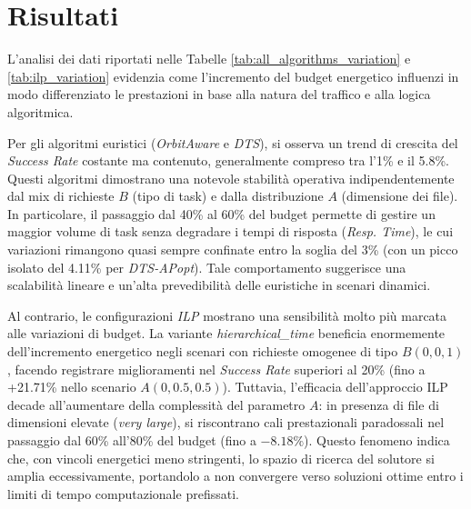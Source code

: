 \documentclass[12pt]{article}
\begin{document}
\section{Risultati}

L'analisi dei dati riportati nelle Tabelle \ref{tab:all_algorithms_variation} e \ref{tab:ilp_variation} evidenzia come l'incremento del budget energetico influenzi in modo differenziato le prestazioni in base alla natura del traffico e alla logica algoritmica. 

Per gli algoritmi euristici (\textit{OrbitAware} e \textit{DTS}), si osserva un trend di crescita del \textit{Success Rate} costante ma contenuto, generalmente compreso tra l'1\% e il 5.8\%. Questi algoritmi dimostrano una notevole stabilità operativa indipendentemente dal mix di richieste $B$ (tipo di task) e dalla distribuzione $A$ (dimensione dei file). In particolare, il passaggio dal 40\% al 60\% del budget permette di gestire un maggior volume di task senza degradare i tempi di risposta (\textit{Resp. Time}), le cui variazioni rimangono quasi sempre confinate entro la soglia del 3\% (con un picco isolato del 4.11\% per \textit{DTS-APopt}). Tale comportamento suggerisce una scalabilità lineare e un'alta prevedibilità delle euristiche in scenari dinamici.

Al contrario, le configurazioni \textit{ILP} mostrano una sensibilità molto più marcata alle variazioni di budget. La variante \textit{hierarchical\_time} beneficia enormemente dell'incremento energetico negli scenari con richieste omogenee di tipo $B(0,0,1)$, facendo registrare miglioramenti nel \textit{Success Rate} superiori al 20\% (fino a +21.71\% nello scenario $A(0,0.5,0.5)$). Tuttavia, l'efficacia dell'approccio ILP decade all'aumentare della complessità del parametro $A$: in presenza di file di dimensioni elevate (\textit{very large}), si riscontrano cali prestazionali paradossali nel passaggio dal 60\% all'80\% del budget (fino a $-8.18\%$). Questo fenomeno indica che, con vincoli energetici meno stringenti, lo spazio di ricerca del solutore si amplia eccessivamente, portandolo a non convergere verso soluzioni ottime entro i limiti di tempo computazionale prefissati.
\end{document}
